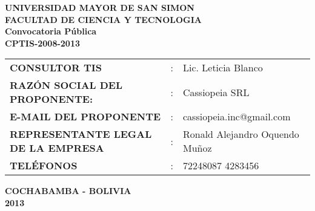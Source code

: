 \documentclass{book}
\begin{document}
\thispagestyle{empty}
\begin{center}
\Large{ \bf{UNIVERSIDAD MAYOR DE SAN SIMON}}
\\
\textbf{FACULTAD DE CIENCIA Y TECNOLOGIA}
\\
\vspace{2.8\baselineskip}
\vspace*{0.7cm}
\Large{\bf Convocatoria P\'ublica \\ CPTIS-2008-2013}
\vspace*{5cm}\\
\begin{center}
    \begin{tabular}{lcp{4cm}}
    \textbf{CONSULTOR TIS }&:& Lic. Leticia Blanco \\
    \textbf{RAZ\'ON SOCIAL DEL PROPONENTE: }&:& Cassiopeia SRL\\
    \textbf{E-MAIL DEL PROPONENTE }&:& cassiopeia.inc@gmail.com\\
    \textbf{REPRESENTANTE LEGAL DE LA EMPRESA } &:& Ronald Alejandro Oquendo Mu\~noz\\
    \textbf{TEL\'EFONOS}&:& 72248087 4283456\\
\end{tabular}
\end{center}
\end{center}
\begin{center}
\vspace{2.8\baselineskip}
\vspace*{5.9cm}
\Large{ \bf{COCHABAMBA - BOLIVIA}\hspace*{1cm}\Large{\\2013}}
\end{center}
\thispagestyle{empty}
\end{document}
